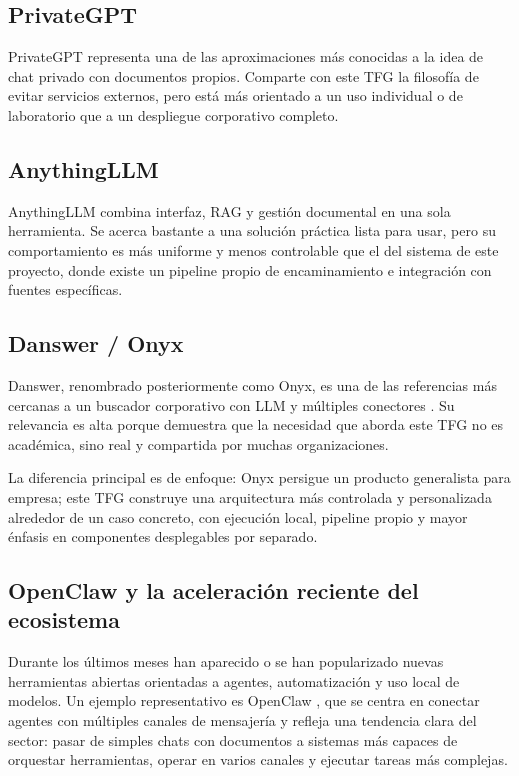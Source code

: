 \subsection{PrivateGPT}

PrivateGPT \cite{privategpt2026docs} representa una de las aproximaciones más conocidas a la idea de chat privado con documentos propios. Comparte con este TFG la filosofía de evitar servicios externos, pero está más orientado a un uso individual o de laboratorio que a un despliegue corporativo completo.

\subsection{AnythingLLM}

AnythingLLM \cite{anythingllm2026docs} combina interfaz, RAG y gestión documental en una sola herramienta. Se acerca bastante a una solución práctica lista para usar, pero su comportamiento es más uniforme y menos controlable que el del sistema de este proyecto, donde existe un pipeline propio de encaminamiento e integración con fuentes específicas.

\subsection{Danswer / Onyx}

Danswer, renombrado posteriormente como Onyx, es una de las referencias más cercanas a un buscador corporativo con LLM y múltiples conectores \cite{onyx2026docs}. Su relevancia es alta porque demuestra que la necesidad que aborda este TFG no es académica, sino real y compartida por muchas organizaciones.

La diferencia principal es de enfoque: Onyx persigue un producto generalista para empresa; este TFG construye una arquitectura más controlada y personalizada alrededor de un caso concreto, con ejecución local, pipeline propio y mayor énfasis en componentes desplegables por separado.

\subsection{OpenClaw y la aceleración reciente del ecosistema}

Durante los últimos meses han aparecido o se han popularizado nuevas herramientas abiertas orientadas a agentes, automatización y uso local de modelos. Un ejemplo representativo es OpenClaw \cite{openclaw2026docs}, que se centra en conectar agentes con múltiples canales de mensajería y refleja una tendencia clara del sector: pasar de simples chats con documentos a sistemas más capaces de orquestar herramientas, operar en varios canales y ejecutar tareas más complejas.

